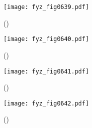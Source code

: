     \begin{figure}[ht!] %
      \centering
      \texttt{[image: fyz\_fig0639.pdf]}
      \caption{
               (\cite[s.~707]{Feynman02})}
      \label{fyz:fig0639}
    \end{figure}

    \begin{figure}[ht!] %
      \centering
      \texttt{[image: fyz\_fig0640.pdf]}
      \caption{
               (\cite[s.~707]{Feynman02})}
      \label{fyz:fig0640}
    \end{figure}

    \begin{figure}[ht!] %
      \centering
      \texttt{[image: fyz\_fig0641.pdf]}
      \caption{
               (\cite[s.~707]{Feynman02})}
      \label{fyz:fig0641}
    \end{figure}

    \begin{figure}[ht!] %
      \centering
      \texttt{[image: fyz\_fig0642.pdf]}
      \caption{
               (\cite[s.~707]{Feynman02})}
      \label{fyz:fig0642}
    \end{figure}

